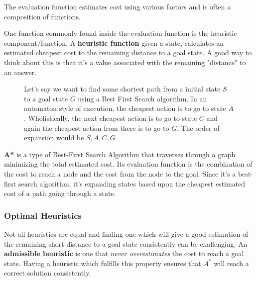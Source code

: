 The evaluation function estimates cost using various factors and is often a composition of functions.


One function commonly found inside the evaluation function is the heuristic component/function. A \textbf{heuristic function} given a state, calculates an estimated cheapest cost to the remaining distance to a goal state. A good way to think about this is that it's a value associated with the remaining "distance" to an answer. 


\begin{figure}
    \centering
    \caption{Let's say we want to find some shortest path from a initial state $S$ to a goal state $G$ using a Best First Search algorithm. In an automaton style of execution, the cheapest action is to go to state $A$. Wholistically, the next cheapest action is to go to state $C$ and again the cheapest action from there is to go to $G$. The order of expansion would be $S,A,C,G$}
    \label{fig:BestFirst}
\end{figure}



\textbf{A* }is a type of Best-First Search Algorithm that traverses through a graph minimizing the total estimated cost. Its evaluation function is the combination of the cost to reach a node and the cost from the node to the goal. Since it's a best-first search algorithm, it's expanding states based upon the cheapest estimated cost of a path going through a state.


\subsubsection*{Optimal Heuristics}
Not all heuristics are equal and finding one which will give a good estimation of the remaining short distance to a goal state consistently can be challenging. An \textbf{admissible heuristic} is one that \textit{never overestimates} the cost to reach a goal state. Having a heuristic which fulfills this property ensures that $A^*$ will reach a correct solution consistently.

